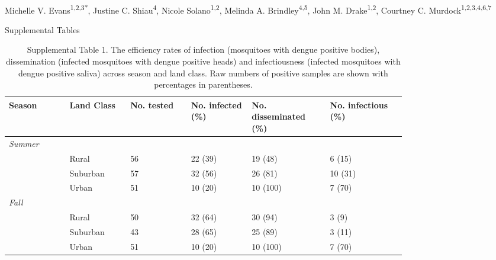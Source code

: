 \documentclass[12pt]{article}
\begin{document}
{\Large
\textbf{}}
\\
Michelle V. Evans\textsuperscript{1,2,3*},
Justine C. Shiau\textsuperscript{4},
Nicole Solano\textsuperscript{1,2},
Melinda A. Brindley\textsuperscript{4,5},
John M. Drake\textsuperscript{1,2},
Courtney C. Murdock\textsuperscript{1,2,3,4,6,7}

\hrulefill
\Large{Supplemental Tables}

\begin{table}
\centering
\begin{tabular}{P{0.12\linewidth}P{0.12\linewidth}P{0.12\linewidth}P{0.12\linewidth}P{0.15\linewidth}P{0.15\linewidth}}
\hline
\textbf{Season} & \textbf{Land Class} & \textbf{No. tested} & \textbf{No. infected (\%)}  & \textbf{No. disseminated (\%)} & \textbf{No. infectious (\%)} \\
\hline
\hline
\textit{Summer} &   &   &   &   \\
     & Rural & 56 & 22 (39) & 19 (48) & 6 (15) \\
   & Suburban & 57 & 32 (56) & 26 (81) & 10 (31) \\
   & Urban & 51 & 10 (20) & 10 (100) & 7 (70) \\

\textit{Fall} &   &   &   &   \\
     & Rural & 50 & 32 (64) & 30 (94) & 3 (9) \\
   & Suburban & 43 & 28 (65) & 25 (89) & 3 (11) \\
   & Urban & 51 & 10 (20) & 10 (100) & 7 (70) \\
\hline
\end{tabular}
\caption{Supplemental Table 1. The efficiency rates of infection (mosquitoes with dengue positive bodies), dissemination (infected mosquitoes with dengue positive heads) and infectiousness (infected mosquitoes with dengue positive saliva) across season and land class. Raw numbers of positive samples are shown with percentages in parentheses.}
\end{table}
\end{document}
